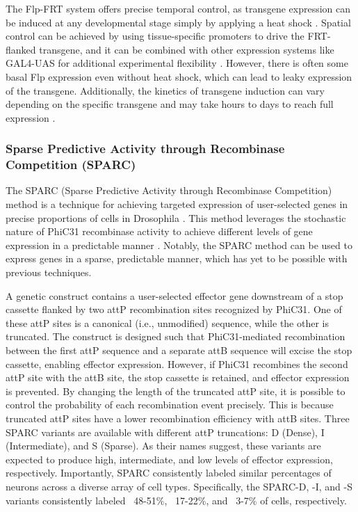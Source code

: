 \documentclass[../main/thesis_msc.tex]{subfiles}
\begin{document}
	The Flp-FRT system offers precise temporal control, as transgene expression can be induced at any developmental stage simply by applying a heat shock \autocite{struhl_organizing_1993}. Spatial control can be achieved by using tissue-specific promoters to drive the FRT-flanked transgene, and it can be combined with other expression systems like GAL4-UAS for additional experimental flexibility \autocite{brand_targeted_1993, mcguire_spatiotemporal_2004}. However, there is often some basal Flp expression even without heat shock, which can lead to leaky expression of the transgene. Additionally, the kinetics of transgene induction can vary depending on the specific transgene and may take hours to days to reach full expression \autocite{mcguire_spatiotemporal_2004, struhl_organizing_1993}.
	\subsubsection{Sparse Predictive Activity through Recombinase Competition (SPARC)}
	The SPARC (Sparse Predictive Activity through Recombinase Competition) method is a technique for achieving targeted expression of user-selected genes in precise proportions of cells in Drosophila \autocite{isaacman-beck_sparc_2020}. This method leverages the stochastic nature of PhiC31 recombinase activity to achieve different levels of gene expression in a predictable manner \autocite{monetti_phic31_2011}. Notably, the SPARC method can be used to express genes in a sparse, predictable manner, which has yet to be possible with previous techniques. 

	A genetic construct contains a user-selected effector gene downstream of a stop cassette flanked by two attP recombination sites recognized by PhiC31. One of these attP sites is a canonical (i.e., unmodified) sequence, while the other is truncated. The construct is designed such that PhiC31-mediated recombination between the first attP sequence and a separate attB sequence will excise the stop cassette, enabling effector expression. However, if PhiC31 recombines the second attP site with the attB site, the stop cassette is retained, and effector expression is prevented. By changing the length of the truncated attP site, it is possible to control the probability of each recombination event precisely.  This is because truncated attP sites have a lower recombination efficiency with attB sites. Three SPARC variants are available with different attP truncations: D (Dense), I (Intermediate), and S (Sparse). As their names suggest, these variants are expected to produce high, intermediate, and low levels of effector expression, respectively. Importantly, SPARC consistently labeled similar percentages of neurons across a diverse array of cell types. Specifically, the SPARC-D, -I, and -S variants consistently labeled ~48-51\%, ~17-22\%, and ~3-7\% of cells, respectively.
\end{document}
